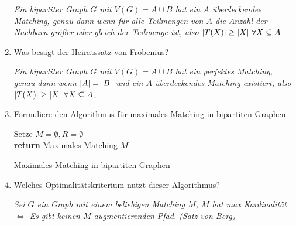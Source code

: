 \documentclass[a4paper,10pt]{scrreprt}
\begin{document}
\begin{enumerate}
		\textit{Ein bipartiter Graph $G$ mit $V(G)=A\dot\cup B$ hat ein $A$ überdeckendes Matching, genau dann wenn für alle Teilmengen von $A$ die Anzahl der Nachbarn größer oder gleich der Teilmenge ist, also $\vert T(X) \vert \ge \vert X \vert~\forall X\subseteq A$.}
		\item Was besagt der Heiratssatz von Frobenius?
		
		\textit{Ein bipartiter Graph $G$ mit $V(G) = A\dot\cup B$ hat ein perfektes Matching, genau dann wenn $\vert A \vert=\vert B \vert$ und ein $A$ überdeckendes Matching existiert, also $\vert T(X) \vert \ge \vert X \vert~\forall X \subseteq A$.}
		\item Formuliere den Algorithmus für maximales Matching in bipartiten Graphen.
		\begin{algorithm}
			\vspace*{5pt}
			Setze $M=\emptyset, R=\emptyset$\\
		\textbf{return} Maximales Matching $M$
		\caption{Maximales Matching in bipartiten Graphen}
	\end{algorithm}
		\item Welches Optimalitätskriterium nutzt dieser Algorithmus?
		
		\textit{Sei $G$ ein Graph mit einem beliebigen Matching $M$, $M$ hat max Kardinalität $\Leftrightarrow$ Es gibt keinen $M$-augmentierenden Pfad. (Satz von Berg)}
	\end{enumerate}	
\end{document}
